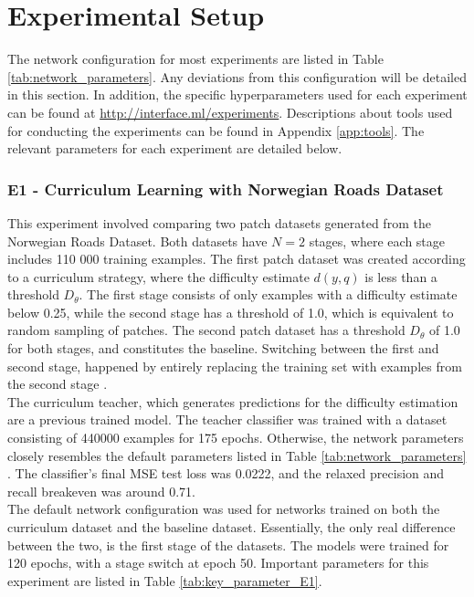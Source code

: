\section{Experimental Setup}
\label{sec:experimentalSetup}
The network configuration for most experiments are listed in Table \ref{tab:network_parameters}. Any deviations from this configuration will be detailed in this section. In addition, the specific hyperparameters used for each experiment can be found at \url{http://interface.ml/experiments}. Descriptions about tools used for conducting the experiments can be found in Appendix \ref{app:tools}. The relevant parameters for each experiment are detailed below.\\ 

\subsubsection{E1 - Curriculum Learning with Norwegian Roads Dataset}
This experiment involved comparing two patch datasets generated from the Norwegian Roads Dataset. Both datasets have $N=2$ stages, where each stage includes 110 000 training examples. The first patch dataset was created according to a curriculum strategy, where the difficulty estimate $d(y, q)$ is less than a threshold $D_\theta$. The first stage consists of only examples with a difficulty estimate below 0.25,  while the second stage has a threshold of 1.0, which is equivalent to random sampling of patches. The second patch dataset has a threshold $D_\theta$ of 1.0 for both stages, and constitutes the baseline. Switching between the first and second stage, happened by entirely replacing the training set with examples from the second stage .\\

The curriculum teacher, which generates predictions for the difficulty estimation are a previous trained model. The teacher classifier was trained with a dataset consisting of 440000 examples for 175 epochs. Otherwise, the network parameters closely resembles the default parameters listed in Table \ref{tab:network_parameters} . The classifier's final \ac{MSE} test loss was 0.0222, and the relaxed precision and recall breakeven was around 0.71. \\

The default network configuration was used for networks trained on both the curriculum dataset and the baseline dataset. Essentially, the only real difference between the two, is the first stage of the datasets. The models were trained for 120 epochs, with a stage switch at epoch 50. Important parameters for this experiment are listed in Table \ref{tab:key_parameter_E1}.\\

